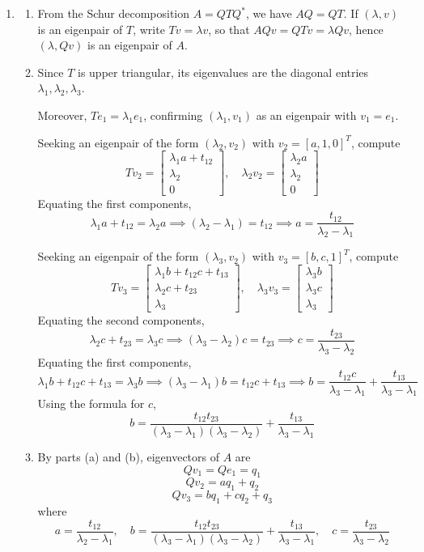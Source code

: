 \documentclass{article}
\newcommand{\m}[2][b]{\begin{#1matrix}#2\end{#1matrix}}
\renewcommand{\l}{\lambda}
\newcommand{\imp}{\implies}
\begin{document}
\begin{enumerate}
	
	
	\pagebreak
	
	
	
	\item
	
	\begin{enumerate}
		
		
		
		
		\item From the Schur decomposition $A=QTQ^*$, we have $AQ=QT$. If $(\l,v)$ is an eigenpair of $T$, write $Tv=\l v$, so that $AQv=QTv=\l Qv$, hence $(\l,Qv)$ is an eigenpair of $A$.
		
		
		
		\item Since $T$ is upper triangular, its eigenvalues are the diagonal entries $\l_1,\l_2,\l_3$.
		
		Moreover, $Te_1=\l_1e_1$, confirming $(\l_1,v_1)$ as an eigenpair with $v_1=e_1$.
		
		Seeking an eigenpair of the form $(\l_2,v_2)$ with $v_2=[a,1,0]^T$, compute
		\[Tv_2 = \m{\l_1a+t_{12} \\ \l_2 \\ 0},
		\quad \l_2v_2 = \m{\l_2a \\ \l_2 \\ 0}\]
		Equating the first components,
		\[\l_1a + t_{12} = \l_2a
		\imp (\l_2-\l_1) = t_{12}
		\imp a = \frac{t_{12}}{\l_2-\l_1}\]
		
		Seeking an eigenpair of the form $(\l_3,v_2)$ with $v_3=[b,c,1]^T$, compute
		\[Tv_3 = \m{\l_1b + t_{12}c + t_{13} \\ \l_2c + t_{23} \\ \l_3},
		\quad \l_3v_3 = \m{\l_3b \\ \l_3c \\ \l_3}\]
		Equating the second components,
		\[\l_2c + t_{23} = \l_3c
		\imp (\l_3-\l_2)c = t_{23}
		\imp c = \frac{t_{23}}{\l_3-\l_2}\]
		Equating the first components,
		\[\l_1b + t_{12}c + t_{13} = \l_3b
		\imp (\l_3-\l_1)b = t_{12}c + t_{13}
		\imp b = \frac{t_{12}c}{\l_3-\l_1} + \frac{t_{13}}{\l_3-\l_1}\]
		Using the formula for $c$,
		\[b = \frac{t_{12}t_{23}}{(\l_3-\l_1)(\l_3-\l_2)} + \frac{t_{13}}{\l_3-\l_1}\]
		
		
		
		\item By parts (a) and (b), eigenvectors of $A$ are
		\[Qv_1 = Qe_1 = q_1\]
		\[Qv_2 = aq_1 + q_2\]
		\[Qv_3 = bq_1 + cq_2 + q_3\]
		where
		\[a = \frac{t_{12}}{\l_2-\l_1},
		\quad b = \frac{t_{12}t_{23}}{(\l_3-\l_1)(\l_3-\l_2)} + \frac{t_{13}}{\l_3-\l_1},
		\quad c = \frac{t_{23}}{\l_3-\l_2}\]
		

\end{enumerate}
\end{enumerate}
\end{document}
